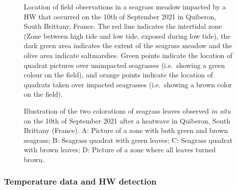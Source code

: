 \documentclass[
  letterpaper,
  11pt,
  english,
  singlespacing,
  headsepline]{MastersDoctoralThesis}
\begin{document}
\begin{spacing}{1.5}
\begin{figure}
{}

\caption{\label{fig-quiberonMap_h}Location of field observations in a
seagrass meadow impacted by a HW that occurred on the 10th of September
2021 in Quiberon, South Brittany, France. The red line indicates the
intertidal zone (Zone between high tide and low tide, exposed during low
tide), the dark green area indicates the extent of the seagrass meadow
and the olive area indicate saltmarshes. Green points indicate the
location of quadrat pictures over unimpacted seagrasses (i.e.~showing a
green colour on the field), and orange points indicate the location of
quadrats taken over impacted seagrasses (i.e.~showing a brown color on
the field).}

\end{figure}%

\begin{figure}


\caption{\label{fig-QuiberonImg_h}Illustration of the two colorations of
seagrass leaves observed \emph{in situ} on the 10th of September 2021
after a heatwave in Quiberon, South Brittany (France). A: Picture of a
zone with both green and brown seagrass; B: Seagrass quadrat with green
leaves; C: Seagrass quadrat with brown leaves; D: Picture of a zone
where all leaves turned brown.}

\end{figure}%

\subsubsection{Temperature data and HW
detection}\label{temperature-data-and-hw-detection}


\end{spacing}
\end{document}
